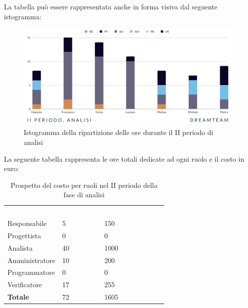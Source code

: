 La tabella può essere rappresentata anche in forma visiva dal seguente istogramma: 
\begin{figure}[!h]
\centering
\includegraphics[scale=0.65]{Sezioni/SezioniPreventivo/grafici/Analisi_II_periodo.png}
\caption{Istogramma della ripartizione delle ore durante il II periodo di analisi}
\end{figure}

La seguente tabella rappresenta le ore totali dedicate ad ogni ruolo e il costo in euro:

\begin{table}[!htbp]
\begin{center}
\renewcommand{\arraystretch}{1.5}
\begin{tabular}{ m{}<{\centering}  m{}<{\centering} m{}<{\centering}}
	\rowcolor{darkblue}
	\textcolor{white}{\textbf{Ruolo}}&\textcolor{white}{\textbf{Totale ore}}&\textcolor{white}{\textbf{Costo totale (\euro)}}\\ 

	Responsabile  & 5 & 150 \\	
	
	Progettista & 0 &  0 \\
	
	Analista & 40 & 1000 \\

	Amministratore & 10 & 200\\
	
	Programmatore & 0 &  0\\
	
	Verificatore & 17 & 255\\
	
	\textbf{Totale} & 72 &  1605 \\
	
\end{tabular}
\caption{Prospetto del costo per ruoli nel II periodo della fase di analisi}
\end{center}
\end{table}

